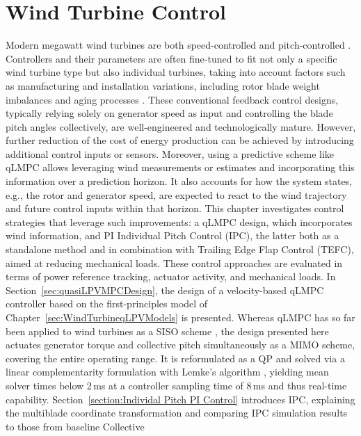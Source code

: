 \chapter{Wind Turbine Control}  \label{sec:Application to Wind Turbine Control4} 
Modern megawatt wind turbines are both speed-controlled and pitch-controlled \cite{pao2011control,mulders2018delft, elkodama2023control}. Controllers and their parameters are often fine-tuned to
fit not only a specific wind turbine type but also individual turbines, taking into account factors
such as manufacturing and installation variations, including rotor blade weight imbalances and
aging processes \cite{en14238083}. These conventional feedback control designs, typically relying
solely on generator speed as input and controlling the blade pitch angles collectively, are
well-engineered and technologically mature. However, further reduction of the cost of energy
production can be achieved by introducing additional control inputs or sensors. Moreover, using a
predictive scheme like qLMPC allows leveraging wind measurements or estimates and incorporating
this information over a prediction horizon. It also accounts for how the system states, e.g., the
rotor and generator speed, are expected to react to the wind trajectory and future control inputs
within that horizon. This chapter investigates control strategies that leverage such improvements:
a qLMPC design, which incorporates wind information, and PI Individual Pitch Control
(IPC), the latter both as a standalone method and in combination with Trailing Edge Flap Control
(TEFC), aimed at reducing mechanical loads. These control approaches are evaluated in terms of
power reference tracking, actuator activity, and mechanical loads.
%
In Section~\ref{sec:quasiLPVMPCDesign}, the design of a velocity-based qLMPC controller based on
the first-principles model of Chapter~\ref{sec:WindTurbineqLPVModels} is presented. Whereas qLMPC
has so far been applied to wind turbines as a SISO scheme \cite{mulders2020preventing, pamososuryo2022individual,
    fonseca2024windTurbineSideSide}, the design presented here actuates generator torque and
collective pitch simultaneously as a MIMO scheme, covering the entire operating range. It is
reformulated as a QP and solved via a linear complementarity formulation with Lemke's algorithm
\cite{cisneros2020velocity}, yielding mean solver times below 2\,ms at a controller sampling time
of 8\,ms and thus real-time capability.
%
Section~\ref{section:Individal Pitch PI Control} introduces IPC, explaining the multiblade
coordinate transformation and comparing IPC simulation results to those from baseline Collective

